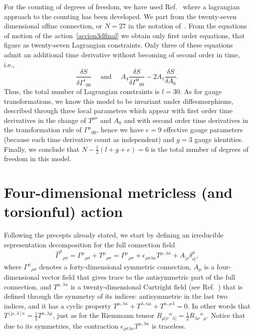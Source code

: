 \documentclass{ws-mpla}
\renewcommand{\(}{\left(}
\renewcommand{\)}{\right)}
\renewcommand{\[}{\left[}
\renewcommand{\]}{\right]}
\begin{document}
For the counting of degrees of freedom, we have used Ref.~ where a lagrangian approach to the counting has been developed. We part from the twenty-seven dimensional affine connection, or $N = 27$ in the notation of~.  From the equations of motion of the action~\eqref{accion3dfinal} we obtain only first order equations, that figure as twenty-seven Lagrangian constraints. Only three of these equations admit an additional time derivative without becoming of second order in time,  i.e., 
\begin{equation*}
  \frac{\delta S}{\delta\Gamma^i{}_{00}} \quad \text{ and } \quad A_4 \frac{\delta S}{\delta\Gamma^0{}_{00}} - 2 A_1 \frac{\delta S}{\delta A_{0}}.
\end{equation*}
Thus, the total number of Lagrangian constraints is \mbox{$l=30$.} As for gauge transformations, we know this model to be invariant under diffeomorphisms, described through three local parameters which appear with first order time derivatives in the change of $T^{\mu\nu}$ and $ A_0$ and with second order time derivatives in the transformation rule of $\Gamma^\mu{}_{00} $, hence we have $e=9$ effective gauge parameters (because each time derivative count as independent) and $g=3$ gauge identities. Finally,  we conclude that   \mbox{$N-\frac{1}{2}(l+g+e) = 6$} is the total number of degrees of freedom in this model. 


\section{\label{sec:4} Four-dimensional metricless (and torsionful) action}

Following the precepts  already stated, we start  by defining an irreducible representation decomposition for the full connection field 
\begin{equation}
  \hat{\Gamma}^\mu{}_{\rho\sigma} = {\Gamma}^\mu{}_{\rho\sigma} + T^\mu{}_{\rho\sigma} = {\Gamma}^\mu{}_{\rho\sigma} + \epsilon_{\rho\sigma\lambda\kappa}T^{\mu,\lambda\kappa}+A_{[\rho}\delta^\mu_{\nu]},
\end{equation}
where ${\Gamma}^\mu{}_{\rho\sigma}$ denotes a forty-dimensional symmetric connection, $A_\mu$ is a four-dimensional vector field  that gives trace to the antisymmetric part of the full connection, and  $T^{\mu,\lambda\kappa}$ is a twenty-dimensional Curtright field (see Ref.~\cite{Curtright:1980yk}) that is defined through the symmetry of its indices: antisymmetric in the last two indices, and it has a cyclic property $T^{\mu,\lambda\kappa}+T^{\lambda,\kappa\mu}+T^{\kappa,\mu\lambda}=0$. In other words that $T^{[\mu,\lambda]\kappa}=\frac{1}{2}T^{\kappa,\lambda\mu}$, just as for  the Riemmann tensor ${R}_{\mu[\nu}{}^\alpha{}_{\lambda]}=\frac{1}{2}{R}_{\lambda\nu}{}^\alpha{}_{\mu}$. Notice that due to its symmetries, the contraction $\epsilon_{\rho\sigma\lambda\kappa}T^{\mu,\lambda\kappa}$ is traceless.
\end{document}
